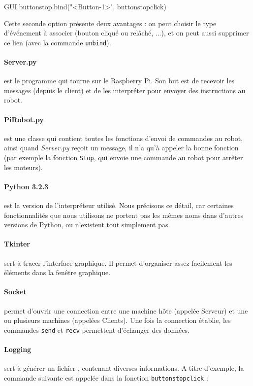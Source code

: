 \documentclass[12pt,a4paper]{report}
\begin{document}
\begin{verbatimtab}[3]
GUI.buttonstop.bind("<Button-1>", buttonstopclick)
\end{verbatimtab}

Cette seconde option présente deux avantages : on peut choisir le type d'événement à associer (bouton cliqué ou relâché, ...), et on peut aussi supprimer ce lien (avec la commande \verb=unbind=).

\paragraph{Server.py} est le programme qui tourne sur le Raspberry Pi. Son but est de recevoir les messages (depuis le client) et de les interpréter pour envoyer des instructions au robot.

\paragraph{PiRobot.py} est une classe qui contient toutes les fonctions d'envoi de commandes au robot, ainsi quand \textit{Server.py} reçoit un message, il n'a qu'à appeler la bonne fonction (par exemple la fonction \verb=Stop=, qui envoie une commande au robot pour arrêter les moteurs).

\paragraph{Python 3.2.3} est la version de l'interpréteur utilisé. Nous précisons ce détail, car certaines fonctionnalités que nous utilisons ne portent pas les mêmes noms dans d'autres versions de Python, ou n'existent tout simplement pas.

\paragraph{Tkinter} sert à tracer l'interface graphique. Il permet d'organiser assez facilement les éléments dans la fenêtre graphique.

\paragraph{Socket} permet d'ouvrir une connection entre une machine hôte (appelée Serveur) et une ou plusieurs machines (appelées Clients). Une fois la connection établie, les commandes \verb=send= et \verb=recv= permettent d'échanger des données.

\paragraph{Logging} sert à générer un fichier , contenant diverses informations. A titre d'exemple, la commande suivante est appelée dans la fonction \verb=buttonstopclick= :
\end{document}
